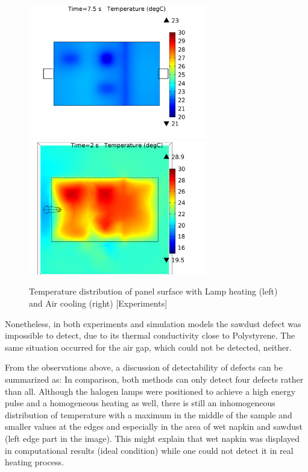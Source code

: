 \documentclass{tQRT2e}
\begin{document}
\begin{figure}
	\includegraphics[width=7.8cm, height=5.85cm]{Truck_panel_flash_03}
	\includegraphics[width=7.8cm, height=5.85cm]{Truck_panel_laminar_final_7_3}
	\caption{Temperature distribution of panel surface with Lamp heating (left) and Air cooling (right) [Experiments]}
	\label{sim_res}
\end{figure}
Nonetheless, in both experiments and simulation models the sawdust defect was impossible to detect, due to its thermal conductivity close to Polystyrene. The same situation occurred for the air gap, which could not be detected, neither.  

From the observations above, a discussion of detectability of defects can be summarized as:
In comparison, both methods can only detect four defects rather than all. Although the halogen lamps were positioned to achieve a high energy pulse and a homogeneous heating as well, there is still an inhomogeneous distribution of temperature with a maximum in the middle of the sample and smaller values at the edges and especially in the area of wet napkin and sawdust (left edge part in the image). This might explain that wet napkin was displayed in computational results (ideal condition) while one could not detect it in real heating process. 
\end{document}
